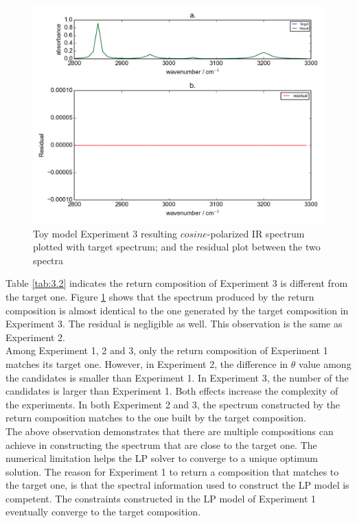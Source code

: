 \begin{figure}[!ht] 
\centering
\includegraphics[scale=0.7]{Figures/toy_model_result_plotting_ir_cos_10candi_1.png} 
\caption{Toy model Experiment 3 resulting $cosine$-polarized IR spectrum plotted with target spectrum; and the residual plot between the two spectra}
\label{fig:3.3}
\end{figure}

Table \ref{tab:3.2} indicates the return composition of Experiment 3 is different from the target one. Figure \ref{fig:3.3} shows that the spectrum produced by the return composition is almost identical to the one generated by the target composition in Experiment 3. The residual is negligible as well. This observation is the same as Experiment 2. \\

Among Experiment 1, 2 and 3, only the return composition of Experiment 1 matches its target one. However, in Experiment 2, the difference in $\theta$ value among the candidates is smaller than Experiment 1. In Experiment 3, the number of the candidates is larger than Experiment 1. Both effects increase the complexity of the experiments. In both Experiment 2 and 3, the spectrum constructed by the return composition matches to the one built by the target composition. \\

The above observation demonstrates that there are multiple compositions can achieve in constructing the spectrum that are close to the target one. The numerical limitation helps the LP solver to converge to a unique optimum solution. The reason for Experiment 1 to return a composition that matches to the target one, is that the spectral information used to construct the LP model is competent. The constraints constructed in the LP model of Experiment 1 eventually converge to the target composition. \\ 

